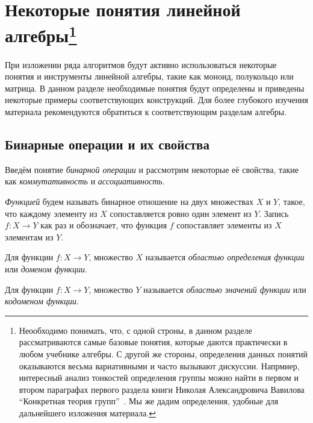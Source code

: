 \chapter[Некоторые понятия линейной алгебры]{Некоторые понятия линейной алгебры\footnote{Неообходимо понимать, что, с одной строны, в данном разделе рассматриваются самые базовые понятия, которые даются практически в любом учебнике алгебры. С другой же стороны, определения данных понятий оказываются весьма вариативными и часто вызывают дискуссии. Напрмиер, интересный анализ тонкостей определения группы можно найти в первом и втором параграфах первого раздела книги Николая Александровича Вавилова ``Конкретная теория групп''~\cite{VavilovGroups}. Мы же дадим определения, удобные для дальнейшего изложения материала.}}\label{chpt:LinAlIntro}

При изложении ряда алгоритмов будут активно использоваться некоторые понятия и инструменты линейной алгебры, такие как моноид, полукольцо или матрица.
В данном разделе необходимые понятия будут определены и приведены некоторые примеры соответствующих конструкций. Для более глубокого изучения материала рекомендуются обратиться к соответствующим разделам алгебры.


\section{Бинарные операции и их свойства}


Введём понятие \textit{бинарной операции} и рассмотрим некоторые её свойства, такие как \textit{коммутативность} и \textit{ассоциативность}.

\begin{definition}
	\textit{Функцией} будем называть бинарное отношение на двух множествах $X$ и $Y$, такое, что каждому элементу из $X$ сопоставляется ровно один элемент из $Y$. Запись $f: X \to Y$ как раз и обозначает, что функция $f$ сопоставляет элементы из $X$ элементам из $Y$.
\end{definition}

\begin{definition}
	Для функции $f: X \to Y$, множество $X$ называется \textit{областью определения функции} или \textit{доменом функции}.
\end{definition}

\begin{definition}
	Для функции $f: X \to Y$, множество $Y$ называется \textit{областью значений функции} или \textit{кодоменом функции}.
\end{definition}

